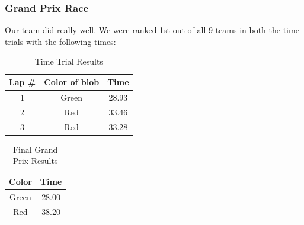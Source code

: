 \documentclass[journal, a4paper]{IEEEtran}
\begin{document}
\subsubsection{Grand Prix Race}
Our team did really well. We were ranked 1st out of all 9 teams in both the time trials with the following times:
    \begin{table}[!hbt]
        \begin{center}
        \caption{Time Trial Results}
        \begin{tabular}{|c|c|c|}
            \hline
			\textbf{Lap \#} & \textbf{Color of blob} & \textbf{Time} \\
			\hline
            1 & Green & 28.93\\
            \hline
            2 & Red & 33.46 \\
            \hline
            3 & Red & 33.28\\
            \hline
        \end{tabular}
        \end{center}
    \end{table}
    \begin{table}[!hbt]
        \begin{center}
		\caption{Final Grand Prix Results}
        \begin{tabular}{|c|c|}
            \hline
			\textbf{Color} & \textbf{Time} \\
			\hline
            Green & 28.00 \\
            \hline
            Red & 38.20 \\
            \hline
        \end{tabular}
        \end{center}
    \end{table}
\end{document}

